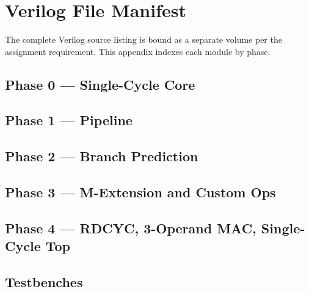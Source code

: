 \chapter{Verilog File Manifest}
\label{app:files}

The complete Verilog source listing is bound as a separate volume per
the assignment requirement. This appendix indexes each module by phase.

\section*{Phase 0 — Single-Cycle Core}

\section*{Phase 1 — Pipeline}

\section*{Phase 2 — Branch Prediction}

\section*{Phase 3 — M-Extension and Custom Ops}

\section*{Phase 4 — RDCYC, 3-Operand MAC, Single-Cycle Top}

\section*{Testbenches}
